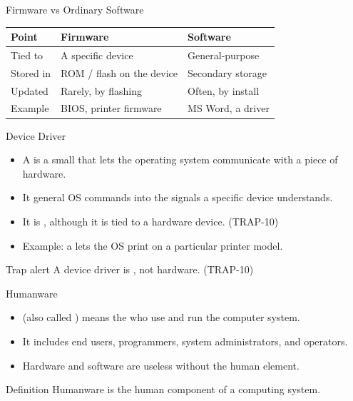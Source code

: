 \documentclass[aspectratio=169]{beamer}
\begin{document}
\begin{frame}{Firmware vs Ordinary Software}
  \begin{center}
    \begin{tabular}{p{}p{}p{}}
      \toprule
      \textbf{Point} & \textbf{Firmware} & \textbf{Software} \\
      \midrule
      Tied to & A specific device & General-purpose \\
      Stored in & ROM / flash on the device & Secondary storage \\
      Updated & Rarely, by flashing & Often, by install \\
      Example & BIOS, printer firmware & MS Word, a driver \\
      \bottomrule
    \end{tabular}
  \end{center}
  \vspace{0.2cm}
\end{frame}

\begin{frame}{Device Driver}
  \begin{itemize}
    \item A  is a small  that lets the
      operating system communicate with a piece of hardware.
    \item It  general OS commands into the signals a specific
      device understands.
    \item It is , although it is tied to a hardware device.
      (TRAP-10)
    \item Example: a  lets the OS print on a particular
      printer model.
  \end{itemize}
  \begin{alertblock}{Trap alert}
    A device driver is , not hardware. (TRAP-10)
  \end{alertblock}
\end{frame}

\begin{frame}{Humanware}
  \begin{itemize}
    \item {} (also called ) means the
       who use and run the computer system.
    \item It includes end users, programmers, system administrators, and
      operators.
    \item Hardware and software are useless without the human element.
  \end{itemize}
  \begin{block}{Definition}
    Humanware is the human component of a computing system.
  \end{block}
\end{frame}
\end{document}
